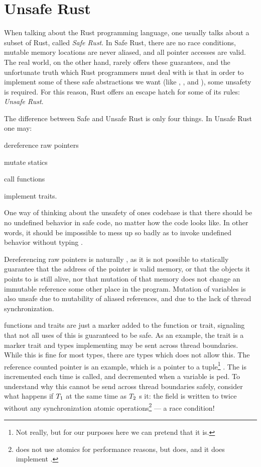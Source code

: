 \section{Unsafe Rust\label{sec:unsafe-rust}}

When talking about the Rust programming language, one usually talks about a subset of Rust, called
\emph{Safe Rust}. In Safe Rust, there are no race conditions, mutable memory locations are never
aliased, and all pointer accesses are valid.  The real world, on the other hand, rarely offers
these guarantees, and the unfortunate truth which Rust programmers must deal with is that in order
to implement some of these safe abstractions we want (like , , and
), some unsafety is required.  For this reason, Rust offers an escape hatch for some of
its rules: \emph{Unsafe Rust}.

The difference between Safe and Unsafe Rust is only four things. In Unsafe Rust one may:
\begin{enumerate*}[1) ]
    \item dereference raw pointers
    \item mutate statics
    \item call  functions
    \item implement  traits.
\end{enumerate*}
One way of thinking about the unsafety of ones codebase is that there should be no undefined
behavior in safe code, no matter how the code looks like. In other words, it should be impossible
to mess up so badly as to invoke undefined behavior without typing .

Dereferencing raw pointers is naturally , as it is not possible to statically
guarantee that the address of the pointer is valid memory, or that the objects it points to is
still alive, nor that mutation of that memory does not change an immutable reference some other
place in the program. Mutation of  variables is also unsafe due to mutability of
aliased references, and due to the lack of thread synchronization.

 functions and traits are just a marker added to the function or trait, signaling that
not all uses of this is guaranteed to be safe. As an example, the trait  is a marker
trait and types implementing  may be sent across thread boundaries. While this is fine
for most types, there are types which does not allow this. The reference counted pointer
 is an example, which is a pointer to a tuple\footnote{Not really, but for our purposes
here we can pretend that it is.} . The  is incremented each time
 is called, and decremented when a variable is ped.  To understand why
this cannot be send across thread boundaries safely, consider what happens if $T\sb{1}$
 at the same time as $T\sb{2}$ s it: the  field is written to
twice without any synchronization atomic operations\footnote{ does not use atomics for
performance reasons, but  does, and it does implement .} --- a race condition!

